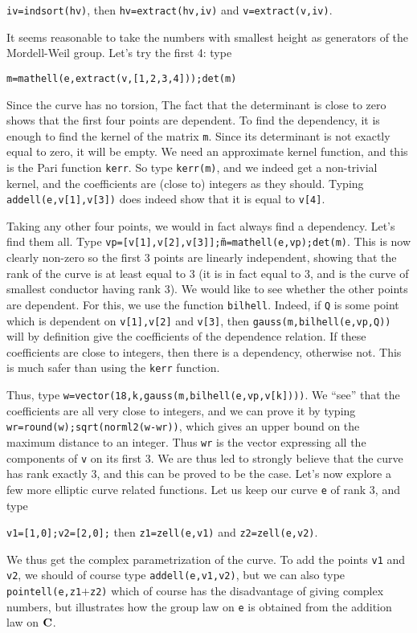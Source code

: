 {\tt iv=indsort(hv)}, then {\tt hv=extract(hv,iv)} and {\tt v=extract(v,iv)}.

It seems reasonable to take the numbers with smallest height as generators
of the Mordell-Weil group. Let's try the first 4: type

{\tt m=mathell(e,extract(v,[1,2,3,4]));det(m)}

Since the curve has no torsion, The fact that the determinant is close to 
zero shows that the first four points are dependent. To find the dependency,
it is enough to find the kernel of the matrix {\tt m}. Since its determinant
is not exactly equal to zero, it will be empty. We need an approximate kernel
function, and this is the Pari function {\tt kerr}. So type {\tt kerr(m)}, 
and we indeed get a non-trivial kernel, and the coefficients are (close to)
integers as they should. Typing {\tt addell(e,v[1],v[3])} does indeed show
that it is equal to {\tt v[4]}.

Taking any other four points, we would in fact always find a dependency. Let's
find them all. Type {\tt vp=[v[1],v[2],v[3]]\~;m=mathell(e,vp);det(m)}. This is
now clearly non-zero so the first 3 points are linearly independent, showing
that the rank of the curve is at least equal to 3 (it is in fact equal to 3,
and is the curve of smallest conductor having rank 3). We would like to see
whether the other points are dependent. For this, we use the function
{\tt bilhell}. Indeed, if {\tt Q} is some point which is dependent on
{\tt v[1],v[2]} and {\tt v[3]}, then {\tt gauss(m,bilhell(e,vp,Q))} will by
definition give the coefficients of the dependence relation. If these 
coefficients are close to integers, then there is a dependency, otherwise not.
This is much safer than using the {\tt kerr} function.

Thus, type {\tt w=vector(18,k,gauss(m,bilhell(e,vp,v[k])))}. We ``see'' that
the coefficients are all very close to integers, and we can prove it by
typing {\tt wr=round(w);sqrt(norml2(w-wr))}, which gives an upper bound
on the maximum distance to an integer. Thus {\tt wr} is the vector expressing
all the components of {\tt v} on its first 3. We are thus led to strongly
believe that the curve has rank exactly 3, and this can be proved to be
the case.
\smallskip
Let's now explore a few more elliptic curve related functions. Let us keep
our curve {\tt e} of rank 3, and type 

{\tt v1=[1,0];v2=[2,0];} then {\tt z1=zell(e,v1)} and {\tt z2=zell(e,v2)}.

We thus get the complex parametrization of the curve. To add the points
{\tt v1} and {\tt v2}, we should of course type {\tt addell(e,v1,v2)},
but we can also type {\tt pointell(e,z1$+$z2)} which of course has the
disadvantage of giving complex numbers, but illustrates how the group law
on {\tt e} is obtained from the addition law on $\Bbb C$.

